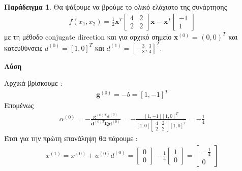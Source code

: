 \documentclass[a4paper,12pt,twoside]{report}
\theoremstyle{plain}
\theoremstyle{definition}
\newtheorem{exmp}{Παράδειγμα}[section] %
\theoremstyle{remark}
\begin{document}
\begin{exmp}
Θα ψάξουμε να βρούμε το ολικό ελάχιστο της συνάρτησης 
\begin{align*}
f(x_1,x_2) = \frac{1}{2}\textbf{x}^{T}\begin{bmatrix}
4 & 2\\
2 & 2
\end{bmatrix}\textbf{x} - \textbf{x}^{T}\begin{bmatrix}
-1\\
1
\end{bmatrix}
\end{align*}
με τη μέθοδο conjugate direction και για αρχικό σημείο \textbf{x}$^{(0)}$ = $(0,0)^T$ και κατευθύνσεις $d^{(0)} = [1,0]^T$ και $d^{(1)} = [-\frac{3}{8},\frac{3}{4}]^T$.

\textbf{Λύση}

Αρχικά βρίσκουμε  : 
\begin{align*}
\textbf{g}^{(0)} = -b = [1,-1]^T
\end{align*}
Επομένως
\begin{align*}
\alpha ^{(0)} = -\frac{\textbf{g}^{(0)T}\textbf{d}^{(0)}}{\textbf{d}^{(0)T}\textbf{Q}\textbf{d}^{(0)}} = - \frac{[1,-1][1,0]^T}{[1,0]\begin{bmatrix}
4 & 2\\
2 & 2
\end{bmatrix}[1, 0]^T} = -\frac{1}{4}
\end{align*}
Έτσι για την πρώτη επανάληψη θα πάρουμε :
\begin{align*}
x^{(1)} = x^{(0)} + a^{(0)}d^{(0)} = \begin{bmatrix}
0\\
0
\end{bmatrix}-\frac{1}{4}\begin{bmatrix}
1\\
0
\end{bmatrix} = \begin{bmatrix}
-\frac{1}{4}\\
0
\end{bmatrix}
\end{align*}


\end{exmp}
\end{document}
